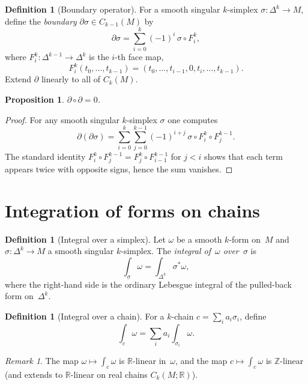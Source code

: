 \documentclass[12pt,a4paper,openany]{book}
\newtheorem{proposition}[theorem]{Proposition}
\theoremstyle{definition}
\newtheorem{definition}[theorem]{Definition}
\theoremstyle{remark}
\newtheorem{remark}[theorem]{Remark}
\newcommand{\Z}{\mathbb{Z}}
\newcommand{\R}{\mathbb{R}}
\begin{document}
\begin{definition}[Boundary operator]\label{def:boundary-op}
For a smooth singular $k$-simplex $\sigma\colon\Delta^k\to M$, define
the \emph{boundary} $\partial\sigma\in C_{k-1}(M)$ by
\[
  \partial\sigma = \sum_{i=0}^{k} (-1)^i\, \sigma\circ F_i^k,
\]
where $F_i^k\colon \Delta^{k-1}\to \Delta^k$ is the $i$-th face map,
\[
  F_i^k(t_0,\dots,t_{k-1}) = (t_0,\dots,t_{i-1},0,t_i,\dots,t_{k-1}).
\]
Extend $\partial$ linearly to all of $C_k(M)$.
\end{definition}

\begin{proposition}\label{prop:dd-zero}
$\partial\circ\partial = 0$.
\end{proposition}

\begin{proof}
For any smooth singular $k$-simplex $\sigma$ one computes
\[
  \partial(\partial\sigma)
  = \sum_{i=0}^k\sum_{j=0}^{k-1} (-1)^{i+j}\, \sigma\circ F_i^k\circ F_j^{k-1}.
\]
The standard identity $F_i^k\circ F_j^{k-1} = F_j^k\circ F_{i-1}^{k-1}$
for $j < i$ shows that each term appears twice with opposite signs, hence the
sum vanishes.
\end{proof}

\section{Integration of forms on chains}\label{sec:integration-chains}

\begin{definition}[Integral over a simplex]\label{def:integral-simplex}
Let $\omega$ be a smooth $k$-form on~$M$ and $\sigma\colon\Delta^k\to M$
a smooth singular $k$-simplex.  The \emph{integral of~$\omega$ over~$\sigma$}
is
\[
  \int_\sigma \omega = \int_{\Delta^k} \sigma^*\omega,
\]
where the right-hand side is the ordinary Lebesgue integral of the
pulled-back form on~$\Delta^k$.
\end{definition}

\begin{definition}[Integral over a chain]\label{def:integral-chain}
For a $k$-chain $c = \sum_i a_i\sigma_i$, define
\[
  \int_c \omega = \sum_i a_i \int_{\sigma_i} \omega.
\]
\end{definition}

\begin{remark}\label{rem:chain-integration-linear}
The map $\omega\mapsto \int_c\omega$ is $\R$-linear in~$\omega$,
and the map $c\mapsto \int_c\omega$ is $\Z$-linear (and extends
to $\R$-linear on real chains $C_k(M;\R)$).
\end{remark}
\end{document}
